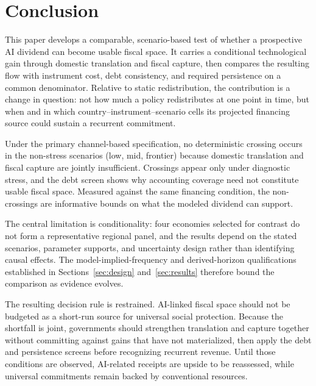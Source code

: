 \section{Conclusion}\label{sec:conclusion}

This paper develops a comparable, scenario-based test of whether a prospective AI dividend can become usable fiscal space. It carries a conditional technological gain through domestic translation and fiscal capture, then compares the resulting flow with instrument cost, debt consistency, and required persistence on a common denominator. Relative to static redistribution, the contribution is a change in question: not how much a policy redistributes at one point in time, but when and in which country--instrument--scenario cells its projected financing source could sustain a recurrent commitment.

Under the primary channel-based specification, no deterministic crossing occurs in the non-stress scenarios (low, mid, frontier) because domestic translation and fiscal capture are jointly insufficient. Crossings appear only under diagnostic stress, and the debt screen shows why accounting coverage need not constitute usable fiscal space. Measured against the same financing condition, the non-crossings are informative bounds on what the modeled dividend can support.

The central limitation is conditionality: four economies selected for contrast do not form a representative regional panel, and the results depend on the stated scenarios, parameter supports, and uncertainty design rather than identifying causal effects. The model-implied-frequency and derived-horizon qualifications established in Sections~\ref{sec:design} and~\ref{sec:results} therefore bound the comparison as evidence evolves.

The resulting decision rule is restrained. AI-linked fiscal space should not be budgeted as a short-run source for universal social protection. Because the shortfall is joint, governments should strengthen translation and capture together without committing against gains that have not materialized, then apply the debt and persistence screens before recognizing recurrent revenue. Until those conditions are observed, AI-related receipts are upside to be reassessed, while universal commitments remain backed by conventional resources.

